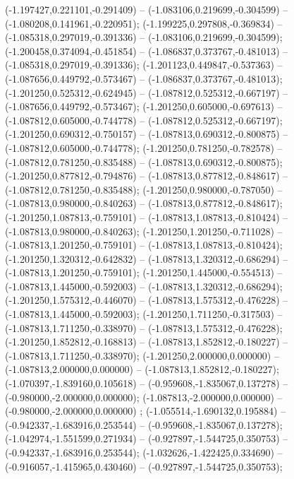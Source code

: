  (-1.197427,0.221101,-0.291409) -- (-1.083106,0.219699,-0.304599) -- (-1.080208,0.141961,-0.220951);
 (-1.199225,0.297808,-0.369834) -- (-1.085318,0.297019,-0.391336) -- (-1.083106,0.219699,-0.304599);
 (-1.200458,0.374094,-0.451854) -- (-1.086837,0.373767,-0.481013) -- (-1.085318,0.297019,-0.391336);
 (-1.201123,0.449847,-0.537363) -- (-1.087656,0.449792,-0.573467) -- (-1.086837,0.373767,-0.481013);
 (-1.201250,0.525312,-0.624945) -- (-1.087812,0.525312,-0.667197) -- (-1.087656,0.449792,-0.573467);
 (-1.201250,0.605000,-0.697613) -- (-1.087812,0.605000,-0.744778) -- (-1.087812,0.525312,-0.667197);
 (-1.201250,0.690312,-0.750157) -- (-1.087813,0.690312,-0.800875) -- (-1.087812,0.605000,-0.744778);
 (-1.201250,0.781250,-0.782578) -- (-1.087812,0.781250,-0.835488) -- (-1.087813,0.690312,-0.800875);
 (-1.201250,0.877812,-0.794876) -- (-1.087813,0.877812,-0.848617) -- (-1.087812,0.781250,-0.835488);
 (-1.201250,0.980000,-0.787050) -- (-1.087813,0.980000,-0.840263) -- (-1.087813,0.877812,-0.848617);
 (-1.201250,1.087813,-0.759101) -- (-1.087813,1.087813,-0.810424) -- (-1.087813,0.980000,-0.840263);
 (-1.201250,1.201250,-0.711028) -- (-1.087813,1.201250,-0.759101) -- (-1.087813,1.087813,-0.810424);
 (-1.201250,1.320312,-0.642832) -- (-1.087813,1.320312,-0.686294) -- (-1.087813,1.201250,-0.759101);
 (-1.201250,1.445000,-0.554513) -- (-1.087813,1.445000,-0.592003) -- (-1.087813,1.320312,-0.686294);
 (-1.201250,1.575312,-0.446070) -- (-1.087813,1.575312,-0.476228) -- (-1.087813,1.445000,-0.592003);
 (-1.201250,1.711250,-0.317503) -- (-1.087813,1.711250,-0.338970) -- (-1.087813,1.575312,-0.476228);
 (-1.201250,1.852812,-0.168813) -- (-1.087813,1.852812,-0.180227) -- (-1.087813,1.711250,-0.338970);
 (-1.201250,2.000000,0.000000) -- (-1.087813,2.000000,0.000000) -- (-1.087813,1.852812,-0.180227);
 (-1.070397,-1.839160,0.105618) -- (-0.959608,-1.835067,0.137278) -- (-0.980000,-2.000000,0.000000);
 (-1.087813,-2.000000,0.000000) -- (-0.980000,-2.000000,0.000000) ;
 (-1.055514,-1.690132,0.195884) -- (-0.942337,-1.683916,0.253544) -- (-0.959608,-1.835067,0.137278);
 (-1.042974,-1.551599,0.271934) -- (-0.927897,-1.544725,0.350753) -- (-0.942337,-1.683916,0.253544);
 (-1.032626,-1.422425,0.334690) -- (-0.916057,-1.415965,0.430460) -- (-0.927897,-1.544725,0.350753);
